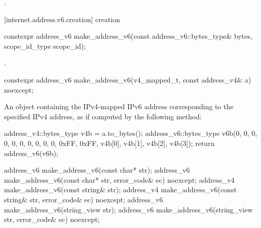 \begin{itemdescr}
\pnum
\returns {}.
\end{itemdescr}



%
[internet.address.v6.creation]{ creation}

\begin{itemdecl}
constexpr address_v6 make_address_v6(const address_v6::bytes_type& bytes,
                                     scope_id_type scope_id);
\end{itemdecl}

\begin{itemdescr}
\pnum
\returns {}.
\end{itemdescr}

\begin{itemdecl}
constexpr address_v6 make_address_v6(v4_mapped_t, const address_v4& a) noexcept;
\end{itemdecl}

\begin{itemdescr}
\pnum
\returns An  object containing the IPv4-mapped IPv6 address corresponding to the specified IPv4 address, as if computed by the following method:
\begin{codeblock}
address_v4::bytes_type v4b = a.to_bytes();
address_v6::bytes_type v6b(0, 0, 0, 0, 0, 0, 0, 0, 0, 0,
                           0xFF, 0xFF, v4b[0], v4b[1], v4b[2], v4b[3]);
return address_v6(v6b);
\end{codeblock}

\end{itemdescr}

\begin{itemdecl}
address_v6 make_address_v6(const char* str);
address_v6 make_address_v6(const char* str, error_code& ec) noexcept;
address_v4 make_address_v6(const string& str);
address_v4 make_address_v6(const string& str, error_code& ec) noexcept;
address_v6 make_address_v6(string_view str);
address_v6 make_address_v6(string_view str, error_code& ec) noexcept;
\end{itemdecl}

